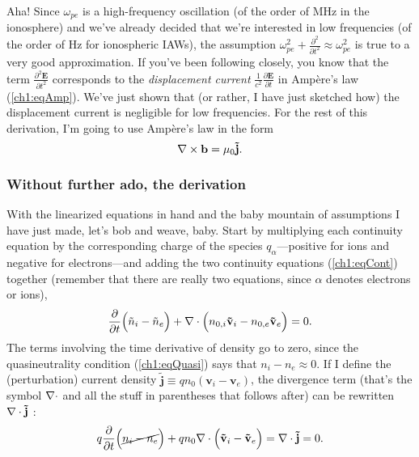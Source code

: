 Aha! Since $\omega_{pe}$ is a high-frequency oscillation (of the order of MHz in
the ionosphere) and we've already decided that we're interested in low
frequencies (of the order of Hz for ionospheric IAWs), the assumption
$\omega_{pe}^2 + \frac{\partial^2}{\partial t^2} \approx \omega_{pe}^2$ is true
to a very good approximation. If you've been following closely, you know that
the term $\frac{\partial^2 \mathbf{E}}{\partial t^2}$ corresponds to the
\emph{displacement current} $\frac{1}{c^2} \frac{\partial \mathbf{E}}{\partial t}$ in
Amp\`{e}re's law (\ref{ch1:eqAmp}). We've just shown that (or rather, I have
just sketched how) the displacement current is negligible for low
frequencies. For the rest of this derivation, I'm going to use Amp\`{e}re's law
in the form
\begin{equation}
  {\bf \nabla} \times \mathbf{b} = \mu_0 \mathbf{\tilde j}.
\end{equation}



\subsubsection{Without further ado, the derivation}

With the linearized equations in hand and the baby mountain of assumptions I
have just made, let's bob and weave, baby. Start by multiplying each continuity
equation by the corresponding charge of the species $q_\alpha$---positive for
ions and negative for electrons---and adding the two continuity equations
(\ref{ch1:eqCont}) together (remember that there are really two equations, since
$\alpha$ denotes electrons or ions),
\begin{equation} \label{ch1:eqCont1} \dfrac{\partial}{\partial t} \Big (
  \tilde n_i - \tilde n_e \Big ) + {\bf \nabla} \cdot \Big (n_{0,i} \mathbf{\tilde v}_i - n_{0,e}
  \mathbf{\tilde v}_{e} \Big ) = 0.
\end{equation}
The terms involving the time derivative of density go to zero, since the
quasineutrality condition (\ref{ch1:eqQuasi}) says that $n_i - n_e \approx
0$. If I define the (perturbation) current density
$\mathbf{\tilde j} \equiv q n_0 ( \mathbf{v}_i - \mathbf{v}_e )$, the divergence
term (that's the symbol ${\bf \nabla} \cdot$ and all the stuff in parentheses that
follows after) can be rewritten ${\bf \nabla} \cdot \mathbf{\tilde j}$ :
\begin{equation*} 
  q\dfrac{\partial}{\partial t} \Big ( \cancel{n_i - n_e} \Big )
  + q n_0 {\bf \nabla} \cdot \Big ( \mathbf{\tilde v}_i - \mathbf{\tilde v}_{e} \Big ) = {\bf \nabla}
  \cdot \mathbf{\tilde j} = 0.
\end{equation*}

